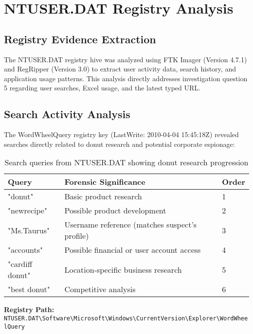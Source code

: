 \chapter{NTUSER.DAT Registry Analysis}

\section{Registry Evidence Extraction}
The NTUSER.DAT registry hive was analyzed using FTK Imager (Version 4.7.1) and RegRipper (Version 3.0) to extract user activity data, search history, and application usage patterns. This analysis directly addresses investigation question 5 regarding user searches, Excel usage, and the latest typed URL.

\section{Search Activity Analysis}
The WordWheelQuery registry key (LastWrite: 2010-04-04 15:45:18Z) revealed searches directly related to donut research and potential corporate espionage:

\begin{table}[htbp]
    \centering
    \begin{tabular}{|l|p{10cm}|l|}
        \hline
        \textbf{Query} & \textbf{Forensic Significance} & \textbf{Order} \\
        \hline
        "donut" & Basic product research & 1 \\
        \hline
        "newrecipe" & Possible product development & 2 \\
        \hline
        "Ms.Taurus" & Username reference (matches suspect's profile) & 3 \\
        \hline
        "accounts" & Possible financial or user account access & 4 \\
        \hline
        "cardiff donut" & Location-specific business research & 5 \\
        \hline
        "best donut" & Competitive analysis & 6 \\
        \hline
    \end{tabular}
    \caption{Search queries from NTUSER.DAT showing donut research progression}
    \label{tab:search_queries}
\end{table}

\textbf{Registry Path:} \texttt{NTUSER.DAT\textbackslash Software\textbackslash Microsoft\textbackslash Windows\textbackslash CurrentVersion\textbackslash Explorer\textbackslash WordWheelQuery}

